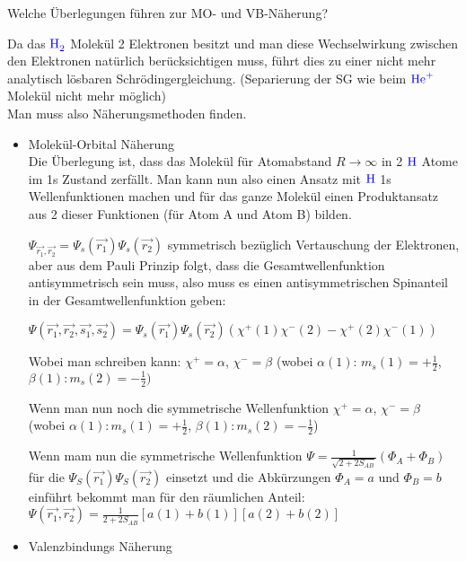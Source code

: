 \documentclass[a5paper,12pt,ngerman,print,grid=front]{kartei}
\let\oldce\ce
\renewcommand*{\ce}[1]{\begingroup\color{blue}\oldce{#1}\endgroup}
\begin{document}
    \begin{karte}{
        Welche Überlegungen führen zur MO- und VB-Näherung?
        }
        	
        Da das $\ce{H2}$ Molekül 2 Elektronen besitzt und man diese Wechselwirkung zwischen 
        den Elektronen natürlich berücksichtigen muss, führt dies zu einer nicht mehr 
        analytisch lösbaren Schrödingergleichung. 
        (Separierung der SG wie beim $\ce{He^+}$ Molekül nicht mehr möglich) \\
		Man muss also Näherungsmethoden finden.
        
        \begin{itemize}
			\item Molekül-Orbital Näherung \\
            
        	Die Überlegung ist, dass das Molekül für Atomabstand $R \rightarrow \infty$ 
        	in 2 $\ce{H}$ Atome im 1s Zustand zerfällt. 
        	Man kann nun also einen Ansatz mit $\ce{H}$ 1s Wellenfunktionen machen und für 
        	das ganze Molekül einen Produktansatz aus 2 dieser Funktionen 
        	(für Atom A und Atom B) bilden.
        	
        	$\Psi_{\vec{r_1},\vec{r_2}} = \Psi_s(\vec{r_1})\Psi_s(\vec{r_2})$ symmetrisch bezüglich
        	Vertauschung der Elektronen, aber aus dem Pauli Prinzip
            folgt, dass die Gesamtwellenfunktion antisymmetrisch sein muss, also muss es 
            einen antisymmetrischen Spinanteil in der Gesamtwellenfunktion geben:
            
            $\Psi(\vec{r_1},\vec{r_2},\vec{s_1},\vec{s_2})=
            \Psi_s(\vec{r_1})\Psi_s(\vec{r_2})(\chi^+(1)\chi^-(2) - \chi^+(2)\chi^-(1))$
            
            Wobei man schreiben kann: 
            $\chi^+ = \alpha$, $\chi^- = \beta$ 
            (wobei $\alpha(1)$: $m_s(1) = +\frac{1}{2}$, $\beta(1): m_s(2) = -\frac{1}{2})$
            
            Wenn man nun noch die symmetrische Wellenfunktion 
            $\chi^+ = \alpha$, $\chi^- = \beta$ 
            (wobei 
            $\alpha(1): m_s(1)= +\frac{1}{2}$, 
            $\beta(1):  m_s(2)= -\frac{1}{2}$)
            
            Wenn mam nun die symmetrische Wellenfunktion 
            $\Psi= \frac{1}{\sqrt{2+2S_{AB}}}(\Phi_A+\Phi_B)$
            für die $\Psi_S(\vec{r_1} ) \Psi_S(\vec{r_2} )$ einsetzt und die Abkürzungen $\Phi_A=a$ und 
            $\Phi_B=b$ einführt bekommt man für den räumlichen Anteil:
            $  \Psi( \vec{r_1}, \vec{r_2} ) = \frac{1}{2+2S_{AB}} \left[ a(1)+b(1) \right]\left[ a(2)+b(2) \right]   $
            
        \item Valenzbindungs Näherung \\
             
            
		\end{itemize}
        
    \end{karte}
        
\end{document}
